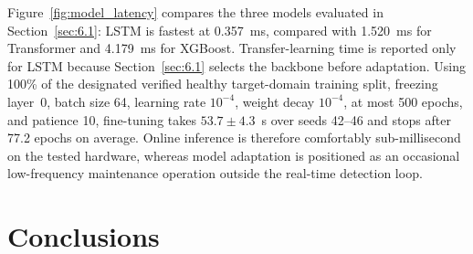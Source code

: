 \documentclass[a4paper,10pt]{cas-sc}%
\newcommand{\roundtworev}[1]{\textcolor{roundtwored}{#1}}
\newenvironment{revision}{}{}
\begin{document}
\begin{revision}
	\roundtworev{Figure~\ref{fig:model_latency} compares the three models evaluated in Section~\ref{sec:6.1}:} LSTM is fastest at 0.357~ms, compared with 1.520~ms for Transformer and 4.179~ms for XGBoost. Transfer-learning time is reported only for LSTM because Section~\ref{sec:6.1} selects the backbone before adaptation. Using 100\% of the designated verified healthy target-domain training split, freezing layer~0, batch size 64, learning rate $10^{-4}$, weight decay $10^{-4}$, at most 500 epochs, and patience 10, fine-tuning takes $53.7\pm4.3$~s over seeds 42--46 and stops after 77.2 epochs on average. Online inference is therefore comfortably sub-millisecond on the tested hardware, whereas model adaptation is positioned as an occasional low-frequency maintenance operation outside the real-time detection loop.
\end{revision}



\section{Conclusions}\label{sec:7}
\end{document}
